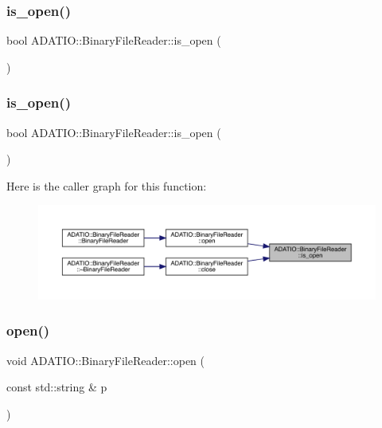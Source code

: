 \subsubsection{\texorpdfstring{is\_open()}{is\_open()}\hspace{0.1cm}{\footnotesize\ttfamily [2/3]}}
{\footnotesize\ttfamily bool A\+D\+A\+T\+I\+O\+::\+Binary\+File\+Reader\+::is\+\_\+open (\begin{DoxyParamCaption}{ }\end{DoxyParamCaption})}

\mbox{\label{classADATIO_1_1BinaryFileReader_a679fa9d101de2993355f4dd193d4f64d}} 
\subsubsection{\texorpdfstring{is\_open()}{is\_open()}\hspace{0.1cm}{\footnotesize\ttfamily [3/3]}}
{\footnotesize\ttfamily bool A\+D\+A\+T\+I\+O\+::\+Binary\+File\+Reader\+::is\+\_\+open (\begin{DoxyParamCaption}{ }\end{DoxyParamCaption})}

Here is the caller graph for this function\+:
\nopagebreak
\begin{figure}[H]
\begin{center}
\leavevmode
\includegraphics[width=350pt]{df/d41/classADATIO_1_1BinaryFileReader_a679fa9d101de2993355f4dd193d4f64d_icgraph}
\end{center}
\end{figure}
\mbox{\label{classADATIO_1_1BinaryFileReader_a5a7c5bb025902fd04642fb154542dc6a}} 
\subsubsection{\texorpdfstring{open()}{open()}\hspace{0.1cm}{\footnotesize\ttfamily [1/3]}}
{\footnotesize\ttfamily void A\+D\+A\+T\+I\+O\+::\+Binary\+File\+Reader\+::open (\begin{DoxyParamCaption}\item[{const std\+::string \&}]{p }\end{DoxyParamCaption})}

